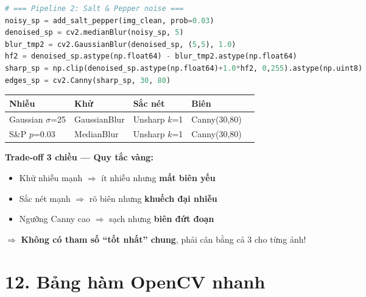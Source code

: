 \documentclass[9pt,landscape,a4paper]{extarticle}
\begin{document}
\begin{multicols*}{3}
\begin{multicols*}{3}
\begin{multicols}{3}
\begin{lstlisting}[language=Python]
# === Pipeline 2: Salt & Pepper noise ===
noisy_sp = add_salt_pepper(img_clean, prob=0.03)
denoised_sp = cv2.medianBlur(noisy_sp, 5)
blur_tmp2 = cv2.GaussianBlur(denoised_sp, (5,5), 1.0)
hf2 = denoised_sp.astype(np.float64) - blur_tmp2.astype(np.float64)
sharp_sp = np.clip(denoised_sp.astype(np.float64)+1.0*hf2, 0,255).astype(np.uint8)
edges_sp = cv2.Canny(sharp_sp, 30, 80)
\end{lstlisting}

\begin{center}\small
\begin{tabular}{@{}lllll@{}}
\toprule
Nhiễu & Khử & Sắc nét & Biên \\
\midrule
Gaussian $\sigma$=25 & GaussianBlur & Unsharp $k$=1 & Canny(30,80) \\
S\&P $p$=0.03 & MedianBlur & Unsharp $k$=1 & Canny(30,80) \\
\bottomrule
\end{tabular}
\end{center}

\begin{notebox}
\textbf{Trade-off 3 chiều --- Quy tắc vàng:}
\begin{itemize}
  \item Khử nhiễu mạnh $\Rightarrow$ ít nhiễu nhưng \textbf{mất biên yếu}
  \item Sắc nét mạnh $\Rightarrow$ rõ biên nhưng \textbf{khuếch đại nhiễu}
  \item Ngưỡng Canny cao $\Rightarrow$ sạch nhưng \textbf{biên đứt đoạn}
\end{itemize}
$\Rightarrow$ \textbf{Không có tham số ``tốt nhất'' chung}, phải cân bằng cả 3 cho từng ảnh!
\end{notebox}

\section{12. Bảng hàm OpenCV nhanh}


\end{multicols}
\end{multicols*}
\end{multicols*}
\end{document}
